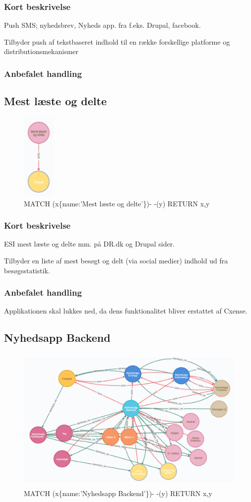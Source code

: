 \documentclass{article}
\begin{document}
\subsubsection{Kort beskrivelse}
Push SMS; nyhedsbrev, Nyheds app. fra f.eks. Drupal, facebook.

Tilbyder push af tekstbaseret indhold til en række forskellige platforme og distributionsmekanismer
\subsubsection{Anbefalet handling}



\subsection{Mest læste og delte}
\begin{figure}[h]
\includegraphics[height=120pt]{MestL.PNG}
\caption{MATCH (x\{name:'Mest læste og delte'\})- -(y) RETURN x,y}
\end{figure}
\subsubsection{Kort beskrivelse}
ESI mest læste og delte mm. på DR.dk og Drupal sider.

Tilbyder en liste af mest besøgt og delt (via social medier) indhold ud fra besøgsstatistik.
\subsubsection{Anbefalet handling}
Applikationen skal lukkes ned, da dens funktionalitet bliver erstattet af Cxense.



\subsection{Nyhedsapp Backend}
\begin{figure}[h]
\includegraphics[height=200pt]{NyhedsappBE.PNG}
\caption{MATCH (x\{name:'Nyhedsapp Backend'\})- -(y) RETURN x,y}
\end{figure}
\end{document}

